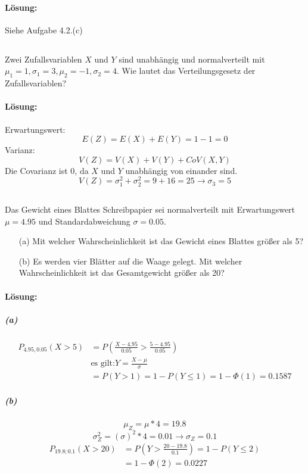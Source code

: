 \documentclass[ngerman]{scrartcl}
\begin{document}
\paragraph{Lösung:}
Siehe Aufgabe 4.2.(c)
\subsection{}
Zwei Zufallsvariablen $X$ und $Y$ sind unabhängig und normalverteilt mit $\mu_1 =1, \sigma_1 = 3, \mu_2 = -1, \sigma_2 = 4$. Wie lautet das Verteilungsgesetz der Zufallsvariablen?
\paragraph{Lösung:}
Erwartungswert:
\begin{equation*}
E(Z) = E(X) + E(Y) = 1 - 1 = 0
\end{equation*}
Varianz:
\begin{equation*}
V(Z) = V(X) + V(Y) + CoV(X,Y)
\end{equation*}
Die Covarianz ist 0, da $X$ und $Y$ unabhängig von einander sind. 
\begin{equation*}
V(Z) = \sigma_1^{2} + \sigma_2^{2} = 9 + 16 = 25 \rightarrow \sigma_3 = 5
\end{equation*}

\subsection{}
Das Gewicht eines Blattes Schreibpapier sei normalverteilt mit Erwartungswert $\mu = 4.95$ und Standardabweichung $\sigma = 0.05$. 
\begin{enumerate}
\item[(a)] Mit welcher Wahrscheinlichkeit ist das Gewicht eines Blattes größer als 5?
\item[(b)] Es werden vier Blätter auf die Waage gelegt. Mit welcher Wahrscheinlichkeit ist das Gesamtgewicht größer als 20?
\end{enumerate}
\paragraph{Lösung:}
\subparagraph{(a)}

\begin{align*}
P_{4.95 , 0.05}(X>5) &= P\left( \frac{X-4.95}{0.05} > \frac{5 - 4.95}{0.05}\right)\\
&\text{es gilt:} Y = \frac{X - \mu}{\sigma}\\
&= P\left(Y > 1\right) = 1 - P\left(Y \le 1\right) = 1 - \Phi (1) = 0.1587
\end{align*}
\subparagraph{(b)}
\[\mu_Z = \mu*4 = 19.8\]
\[\sigma_Z^{2} = (\sigma)^{2}*4 = 0.01 \rightarrow \sigma_Z = 0.1 \]
\begin{align*}
P_{19.8 ; 0.1}(X>20) &= P \left(Y > \frac{20 - 19.8}{0.1}\right) = 1 - P(Y \le 2)\\
&= 1 - \Phi (2) = 0.0227
\end{align*}
\end{document}
